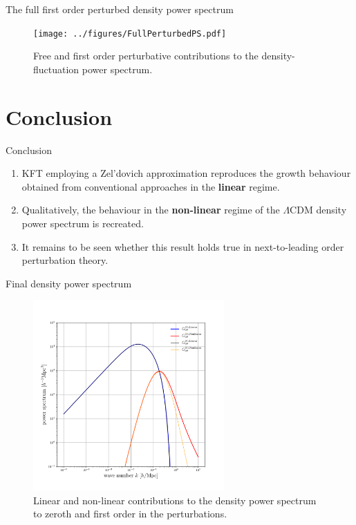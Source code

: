 \documentclass[10pt]{beamer}
\begin{document}
\begin{frame}[fragile]{The full first order perturbed density power spectrum}
	\begin{figure}[h]
		\centering
		\texttt{[image: ../figures/FullPerturbedPS.pdf]}
		\caption{Free and first order perturbative contributions to the density-fluctuation power spectrum.}
		\label{fig:comparison_fullPS}
	\end{figure}
\end{frame}
\section{Conclusion}
\begin{frame}[fragile]{Conclusion}
	\begin{enumerate}
		\item KFT employing a Zel'dovich approximation reproduces the growth behaviour obtained from conventional approaches in the \textbf{linear} regime.
		\vspace{0.5 cm}
		\item Qualitatively, the behaviour in the \textbf{non-linear} regime of the $\Lambda$CDM density power spectrum is recreated.
		\vspace{0.5 cm}
		\item It remains to be seen whether this result holds true in next-to-leading order perturbation theory.
	\end{enumerate}
\end{frame}
\appendix

\begin{frame}{Final density power spectrum}
	\begin{figure}
		\centering
		\includegraphics[width=0.65\textwidth]{FullPerturbedPSLinearAndNonlinear.pdf}
		\caption{Linear and non-linear contributions to the density power spectrum to zeroth and first order in the perturbations.}
	\end{figure}
\end{frame}
\end{document}

